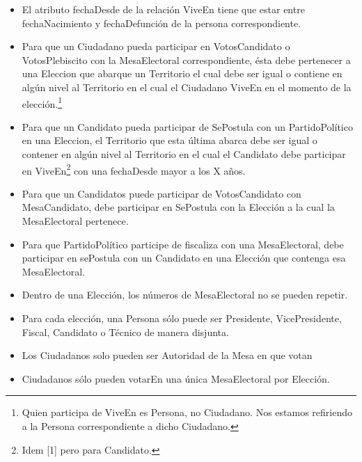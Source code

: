 \begin{itemize}
\item{El atributo fechaDesde de la relación ViveEn tiene que estar entre fechaNacimiento y fechaDefunción de la persona correspondiente.}


\item{Para que un Ciudadano pueda participar en VotosCandidato o VotosPlebiscito con la MesaElectoral correspondiente, ésta debe pertenecer a una Eleccion que abarque un Territorio el cual debe ser igual o contiene en algún nivel al Territorio en el cual el Ciudadano ViveEn en el momento de la elección.\footnote{Quien participa de ViveEn es Persona, no Ciudadano. Nos estamos refiriendo a la Persona correspondiente a dicho Ciudadano.}
}


\item{Para que un Candidato pueda participar de SePostula con un PartidoPolítico en una Eleccion, el Territorio que esta última abarca debe ser igual o contener en algún nivel al Territorio en el cual el Candidato debe participar en ViveEn\footnote{Idem [1] pero para Candidato.} con una fechaDesde mayor a los X años.
}


\item{Para que un Candidatos puede participar de VotosCandidato con MesaCandidato, debe participar en SePostula con la Elección a la cual la MesaElectoral pertenece.
}


\item{Para que PartidoPolítico participe de fiscaliza con una MesaElectoral, debe participar en sePostula con un Candidato en una Elección que contenga esa MesaElectoral.}

\item{Dentro de una Elección, los números de MesaElectoral no se pueden repetir.}

\item{Para cada elección, una Persona sólo puede ser Presidente, VicePresidente, Fiscal, Candidato o Técnico de manera disjunta.}

\item{Los Ciudadanos solo pueden ser Autoridad de la Mesa en que votan}

\item{Ciudadanos sólo pueden votarEn una única MesaElectoral por Elección.}


\end{itemize}
